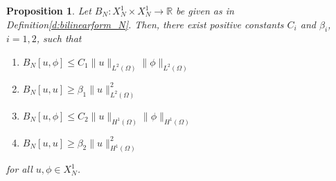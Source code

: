 \documentclass[11pt]{amsart}   	%
\theoremstyle{plain}
\numberwithin{equation}{section}
\newtheorem{proposition}[thm]{Proposition}
\def\R{\mathbb{R}}
\begin{document}
\begin{proposition}\label{p:bilinear_N}
Let $B_N: X^1_N \times X^1_N \longrightarrow \R $ be given as in Definition\ref{d:bilinearform_N}. Then, there exist positive constants $C_i$ and $\beta_i$, $i=1,2$, such that
\begin{enumerate}[label=\textbf{N\arabic*}]
\item\label{N1} $ B_N[u,\phi] \leq C_1 \| u\|_{L^2(\Omega)} \| \phi\|_{L^2(\Omega)}$
\item\label{N2} $ B_N[u,u] \geq \beta_1 \| u\|^2_{L^2(\Omega)}$
\item\label{N3} $ B_N[u,\phi] \leq C_2 \| u\|_{H^1(\Omega)} \| \phi\|_{H^1(\Omega)}$
\item\label{N4} $ B_N[u,u] \geq \beta_2 \| u\|^2_{H^1(\Omega)}$
\end{enumerate}
for all $u, \phi \in X^1_N$.
\end{proposition}
\end{document}
